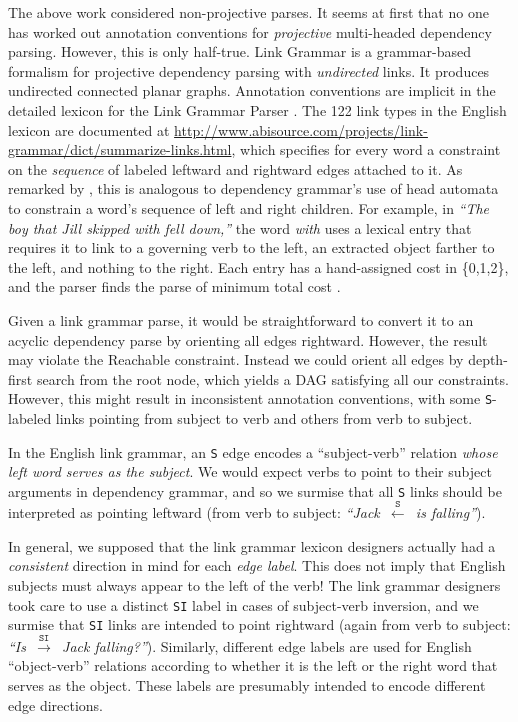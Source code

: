 \documentclass[a4paper,11pt]{article}
\newcommand{\newcite}[1]{\cite{#1}}   %
\begin{document}
The above work considered non-projective parses.  It seems at first that no one has worked out annotation conventions for {\em projective} multi-headed dependency parsing.  However, this is only half-true.  Link Grammar \cite{sleator-temperley-1991} is a grammar-based formalism for projective dependency parsing with {\em undirected} links.  It produces undirected connected planar graphs.  Annotation conventions are implicit in the detailed lexicon for the Link Grammar Parser \cite{LINK-1999}.  The 122 link types in the English lexicon are documented at \url{http://www.abisource.com/projects/link-grammar/dict/summarize-links.html},
which specifies for every word a constraint on the {\em sequence} of labeled leftward and rightward edges attached to it.  As remarked by \newcite{eisner-2000-iwptbook}, this is analogous to dependency grammar's use of head automata to constrain a word's sequence of left and right children.  For example, in {\em ``The boy that Jill skipped with fell down,''} the word {\em with} uses a lexical entry that requires it to link to a governing verb to the left, an extracted object farther to the left, and nothing to the right.  Each entry has a hand-assigned cost in \{0,1,2\}, and the parser finds the parse of minimum total cost \cite{LINK-1999,vepstas-2014}.

Given a link grammar parse, it would be straightforward to convert it to an acyclic dependency parse by orienting all edges rightward.  However, the result may violate the {\sc Reachable} constraint.  Instead we could orient all edges by depth-first search from the root node, which yields a DAG satisfying all our constraints.  However, this might result in inconsistent annotation conventions, with some \texttt{S}-labeled links pointing from subject to verb and others from verb to subject.  

In the English link grammar, an \texttt{S} edge encodes a ``subject-verb'' relation {\em whose left word serves as the subject}.  We would expect verbs to point to their subject arguments in dependency grammar, and so we surmise that all \texttt{S} links should be interpreted as pointing leftward (from verb to subject: {\em ``\mbox{Jack $\stackrel{\texttt{S}}{\leftarrow}$ is} falling''}).

In general, we supposed that the link grammar lexicon designers actually had a {\em consistent} direction in mind for each {\em edge label}.  This does not imply that English subjects must always appear to the left of the verb!  The link grammar designers took care to use a distinct \texttt{SI} label in cases of subject-verb inversion, and we surmise that \texttt{SI} links are intended to point rightward (again from verb to subject: {\em ``\mbox{Is $\stackrel{\texttt{SI}}{\rightarrow}$ Jack} falling?''}).  Similarly, different edge labels are used for English ``object-verb'' relations according to whether it is the left or the right word that serves as the object.  These labels are presumably intended to encode different edge directions.
\end{document}
